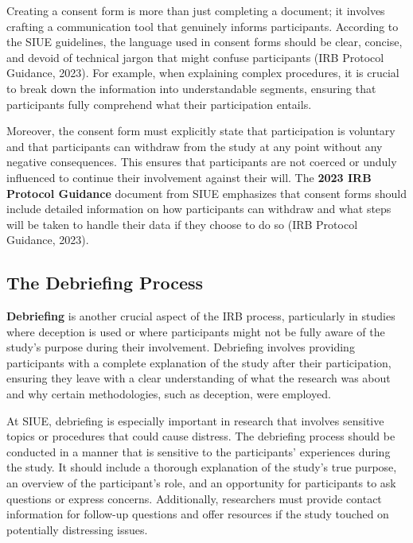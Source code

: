 \documentclass[
]{book}
\begin{document}
Creating a consent form is more than just completing a document; it involves crafting a communication tool that genuinely informs participants. According to the SIUE guidelines, the language used in consent forms should be clear, concise, and devoid of technical jargon that might confuse participants (IRB Protocol Guidance, 2023). For example, when explaining complex procedures, it is crucial to break down the information into understandable segments, ensuring that participants fully comprehend what their participation entails.

Moreover, the consent form must explicitly state that participation is voluntary and that participants can withdraw from the study at any point without any negative consequences. This ensures that participants are not coerced or unduly influenced to continue their involvement against their will. The \textbf{2023 IRB Protocol Guidance} document from SIUE emphasizes that consent forms should include detailed information on how participants can withdraw and what steps will be taken to handle their data if they choose to do so (IRB Protocol Guidance, 2023).

\subsection*{The Debriefing Process}\label{the-debriefing-process}

\textbf{Debriefing} is another crucial aspect of the IRB process, particularly in studies where deception is used or where participants might not be fully aware of the study's purpose during their involvement. Debriefing involves providing participants with a complete explanation of the study after their participation, ensuring they leave with a clear understanding of what the research was about and why certain methodologies, such as deception, were employed.

At SIUE, debriefing is especially important in research that involves sensitive topics or procedures that could cause distress. The debriefing process should be conducted in a manner that is sensitive to the participants' experiences during the study. It should include a thorough explanation of the study's true purpose, an overview of the participant's role, and an opportunity for participants to ask questions or express concerns. Additionally, researchers must provide contact information for follow-up questions and offer resources if the study touched on potentially distressing issues.
\end{document}
